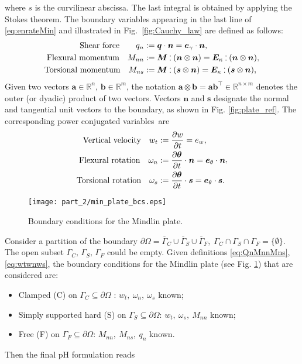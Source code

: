 where $s$ is the curvilinear abscissa. The last integral is obtained by applying the Stokes theorem. The boundary variables appearing in the last line of \eqref{eq:enrateMin} and illustrated in Fig.~\ref{fig:Cauchy_law} are defined as follows:
\begin{equation}
\label{eq:QnMnnMns}
\begin{aligned}
\text{Shear force}  \qquad q_{n} &:= \bm{q} \cdot \bm{n}=  \bm{e}_{\gamma} \cdot \bm{n},  \\
\text{Flexural momentum} \quad 
M_{nn} &:=  \bm{M} \cddot (\bm{n}\otimes{\bm{n}}) = \bm{E}_{\kappa} \cddot (\bm{n}\otimes{\bm{n}}) 	\\
\text{Torsional momentum} \quad M_{ns} &:= \bm{M} \cddot (\bm{s}\otimes{\bm{n}}) = \bm{E}_{\kappa} \cddot (\bm{s}\otimes{\bm{n}}),	
\end{aligned},
\end{equation}
Given two vectors $\bm{a} \in \mathbb{R}^n, \, \bm{b} \in \mathbb{R}^m$, the notation $\bm{a}\otimes{\bm{b}} = \bm{a} \bm{b}^\top \in \mathbb{R}^{n\times m}$ denotes the outer (or dyadic) product of two vectors.
Vectors $\bm{n}$ and $\bm{s}$ designate the normal and tangential unit vectors to the boundary, as shown in Fig. \ref{fig:plate_ref}.  The corresponding power conjugated variables~are
\begin{equation} 
\label{eq:wtwnws}
\begin{aligned}
\text{Vertical velocity}  \quad w_t &:= \diffp{w}{t} = e_w, \\
\text{Flexural rotation} \quad 
\omega_{n} &:= \diffp{\bm{\theta}}{t} \cdot \bm{n} = \bm{e}_\theta \cdot \bm{n} \\
\text{Torsional rotation} \quad 
\omega_{s} &:= \diffp{\bm{\theta}}{t} \cdot \bm{s} = \bm{e}_\theta \cdot \bm{s}.	
\end{aligned},
\end{equation}

\begin{figure}[tb]
	\centering
	\texttt{[image: part\_2/min\_plate\_bcs.eps]}
	\caption{Boundary conditions for the Mindlin plate.}
	\label{fig:bcs_min}
\end{figure}
Consider a partition of the boundary $\partial \Omega  = \overline{\Gamma}_{C} \cup \overline{\Gamma}_{S} \cup \overline{\Gamma}_{F}, \; {\Gamma}_{C} \cap {\Gamma}_{S} \cap {\Gamma}_{F} = \{\emptyset\}$. The open subset $\Gamma_{C}, \, \Gamma_{S}, \, \Gamma_{F}$ could be empty. Given definitions \eqref{eq:QnMnnMns}, \eqref{eq:wtwnws}, the boundary conditions for the Mindlin plate \cite{duran1999approximation} (see Fig. \ref{fig:bcs_min}) that are considered are:
\begin{itemize}
\item Clamped (C) on $\Gamma_{C}\subseteq \partial \Omega$ : $w_t, \ \omega_{n}, \ \omega_{s}$ known;
\item Simply supported hard (S) on $\Gamma_{S}\subseteq \partial \Omega$: $w_t, \ \omega_{s}, \ M_{nn}$ known;
\item Free (F) on $\Gamma_{F}\subseteq \partial \Omega$: $M_{nn}, \ M_{ns}, \ q_n$ known.
\end{itemize}
Then the final pH formulation reads

